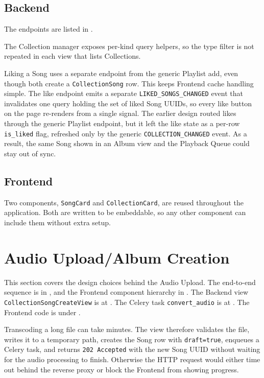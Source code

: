\subsection{Backend}
The endpoints are listed in
.

The Collection manager exposes per-kind query helpers, so the type
filter is not repeated in each view that lists Collections.

Liking a Song uses a separate endpoint from the generic Playlist add,
even though both create a \texttt{CollectionSong} row. This keeps
Frontend cache handling simple. The like endpoint emits a separate
\texttt{LIKED\_SONGS\_CHANGED} event that invalidates one query
holding the set of liked Song UUIDs, so every like button on the page
re-renders from a single signal. The earlier design routed likes
through the generic Playlist endpoint, but it left the like state as
a per-row \texttt{is\_liked} flag, refreshed only by the generic
\texttt{COLLECTION\_CHANGED} event. As a result, the same Song shown
in an Album view and the Playback Queue could stay out of sync.

\subsection{Frontend}
Two components, \texttt{SongCard} and \texttt{CollectionCard}, are
reused throughout the application. Both are written to be embeddable,
so any other component can include them without extra setup.


\section{Audio Upload/Album Creation}\label{sec:audio_upload}
This section covers the design choices behind the Audio Upload.
The end-to-end sequence is in
,
and the Frontend component hierarchy in
.
The Backend view \texttt{CollectionSongCreateView} is at
.
The Celery task \texttt{convert\_audio} is at
.
The Frontend code is under
.

Transcoding a long file can take minutes. The view therefore
validates the file, writes it to a temporary path, creates the Song
row with \texttt{draft=true}, enqueues a Celery task, and returns
\texttt{202 Accepted} with the new Song UUID without waiting for the
audio processing to finish. Otherwise the HTTP request would either
time out behind the reverse proxy or block the Frontend from showing
progress.

